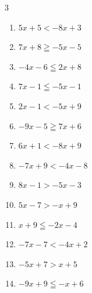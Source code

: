 \begin{multicols}{3}
\begin{enumerate}
  \item $5x+5<-8x+3$


  \item $7x+8\geqq -5x-5$


\columnbreak %

  \item $-4x-6\leqq 2x+8$


  \item $7x-1\leqq -5x-1$

        \phantom{$\displaystyle x\leqq 0$}

  \item $2x-1<-5x+9$


  \item $-9x-5\geqq 7x+6$


  \item $6x+1<-8x+9$


  \item $-7x+9<-4x-8$


  \item $8x-1>-5x-3$


  \item $5x-7>-x+9$


  \item $x+9\leqq -2x-4$


  \item $-7x-7<-4x+2$

        \phantom{$\displaystyle x>-3$}

  \item $-5x+7>x+5$


  \item $-9x+9\leqq -x+6$


\end{enumerate}
\end{multicols}
